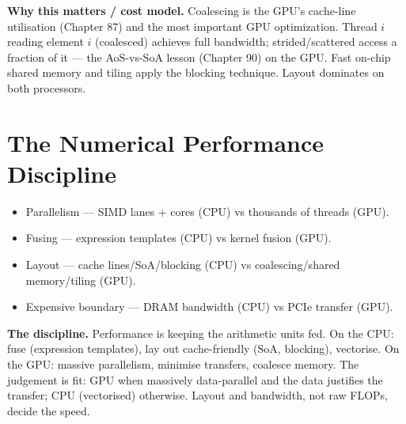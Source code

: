 \textbf{Why this matters / cost model.} Coalescing is the GPU's cache-line utilisation (Chapter 87) and the most important GPU optimization. Thread $i$ reading element $i$ (coalesced) achieves full bandwidth; strided/scattered access a fraction of it --- the AoS-vs-SoA lesson (Chapter 90) on the GPU. Fast on-chip shared memory and tiling apply the blocking technique. Layout dominates on both processors.

\section{The Numerical Performance Discipline}
\begin{itemize}
\item Parallelism --- SIMD lanes + cores (CPU) vs thousands of threads (GPU).
\item Fusing --- expression templates (CPU) vs kernel fusion (GPU).
\item Layout --- cache lines/SoA/blocking (CPU) vs coalescing/shared memory/tiling (GPU).
\item Expensive boundary --- DRAM bandwidth (CPU) vs PCIe transfer (GPU).
\end{itemize}

\textbf{The discipline.} Performance is keeping the arithmetic units fed. On the CPU: fuse (expression templates), lay out cache-friendly (SoA, blocking), vectorise. On the GPU: massive parallelism, minimise transfers, coalesce memory. The judgement is fit: GPU when massively data-parallel and the data justifies the transfer; CPU (vectorised) otherwise. Layout and bandwidth, not raw FLOPs, decide the speed.
